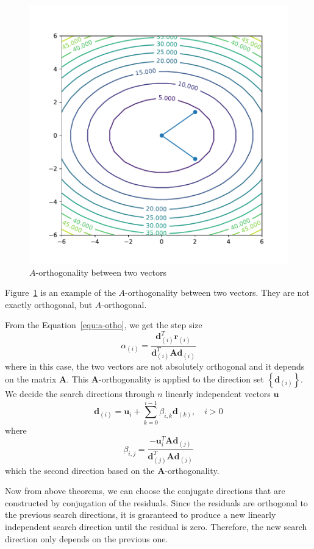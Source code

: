 \begin{figure}[t]
    \label{fig:a-ortho}
    \centering
    \includegraphics[page=1, width=.6\textwidth]{figs/a-orthogonal-example.pdf}
    \caption{$A$-orthogonality between two vectors}
\end{figure}
\par Figure~\ref{fig:a-ortho} is an example of the $A$-orthogonality between two vectors. They are not exactly orthogonal, but $A$-orthogonal. 
\par From the Equation~\ref{equ:a-otho}, we get the step size
\begin{equation}
    \label{equ:ini-stepsize}
    \alpha_{(i)}=\frac{\mathbf{d}_{(i)}^{T} \mathbf{r}_{(i)}}{\mathbf{d}_{(i)}^{T} \mathbf{A} \mathbf{d}_{(i)}}
\end{equation}
where in this case, the two vectors are not absolutely orthogonal and it depends on the matrix $\mathbf{A}$. This $\mathbf{A}$-orthogonality is applied to the direction set $\left\{\mathbf{d}_{(i)}\right\}$. We decide the search directions through $n$ linearly independent vectors $\mathbf{u}$
\begin{equation}
    \mathbf{d}_{(i)}=\mathbf{u}_{i}+\sum_{k=0}^{i-1} \beta_{i, k} \mathbf{d}_{(k)}, \quad i>0
\end{equation}
where 
\begin{equation}
    \label{equ:update-beta}
    \beta_{i, j}=\frac{-\mathbf{u}_{i}^{T} \mathbf{A} \mathbf{d}_{(j)}}{\mathbf{d}_{(j)}^{T} \mathbf{A} \mathbf{d}_{(j)}}
\end{equation}
which the second direction based on the $\mathbf{A}$-orthogonality. 
\par Now from above theorems, we can choose the conjugate directions that are constructed by conjugation of the residuals. Since the residuals are orthogonal to the previous search directions, it is graranteed to produce a new linearly independent search direction until the residual is zero. Therefore, the new search direction only depends on the previous one. 
